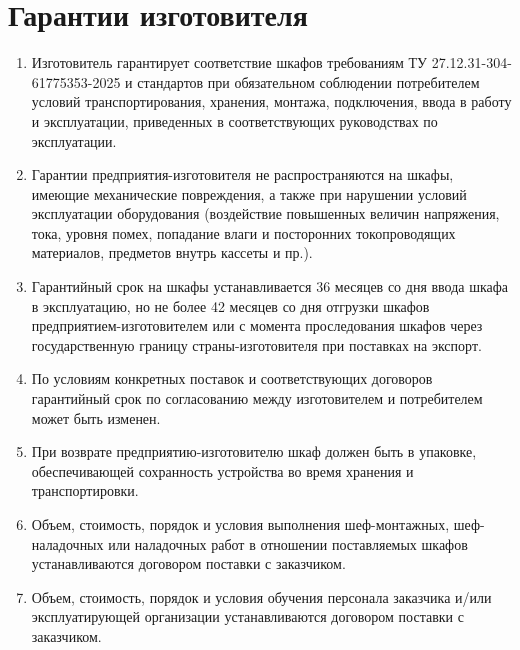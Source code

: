 \color{unidarkgreen}\section[Гарантии изготовителя]{Гарантии изготовителя}\color{black}

\begin{enumerate}[label=\arabic{section}.\arabic*, align=left, labelsep=4pt, leftmargin=0pt, itemindent=2cm]

\item
Изготовитель гарантирует соответствие шкафов требованиям ТУ 27.12.31-304-61775353-2025 и стандартов при обязательном соблюдении потребителем условий транспортирования, хранения, монтажа, подключения, ввода в работу и эксплуатации, приведенных в соответствующих руководствах по эксплуатации.

\item
Гарантии предприятия-изготовителя не распространяются на шкафы, имеющие механические повреждения, а также при нарушении условий эксплуатации оборудования (воздействие повышенных величин напряжения, тока, уровня помех, попадание влаги и посторонних токопроводящих материалов, предметов внутрь кассеты и пр.).

\item
Гарантийный срок на шкафы устанавливается 36 месяцев со дня ввода шкафа в эксплуатацию, но не более 42 месяцев со дня отгрузки шкафов предприятием-изготовителем или с момента проследования шкафов через государственную границу страны-изготовителя при поставках на экспорт.

\item
По условиям конкретных поставок и соответствующих договоров гарантийный срок по согласованию между изготовителем и потребителем может быть изменен.

\item
При возврате предприятию-изготовителю шкаф должен быть в упаковке, обеспечивающей сохранность устройства во время хранения и транспортировки.

\item
Объем, стоимость, порядок и условия выполнения шеф-монтажных, шеф-наладочных или наладочных работ в отношении поставляемых шкафов устанавливаются договором поставки с заказчиком.

\item
Объем, стоимость, порядок и условия обучения персонала заказчика и/или эксплуатирующей организации устанавливаются договором поставки с заказчиком.

\end{enumerate}